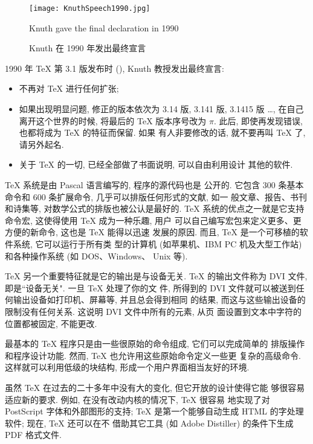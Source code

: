 \begin{figure}
  \centering
  \texttt{[image: KnuthSpeech1990.jpg]}\\
  \caption{Knuth  在 1990 年发出最终宣言}{Knuth gave the final declaration in 1990}
  \label{fig:KnuthSpeech1990}
\end{figure}


1990 年 \TeX{} \index{\TeX} 第 3.1 版发布时 (\cite{BaoTaiLei2008}), Knuth  教授发出最终宣言:
\begin{itemize}
  \item 不再对 \TeX{} \index{\TeX} 进行任何扩张;
  \item 如果出现明显问题, 修正的版本依次为 3.14 版, 3.141 版, 3.1415 版 \ldots,
        在自己离开这个世界的时候, 将最后的 \TeX{} \index{\TeX} 版本序号改为 $\pi$.
        此后, 即使再发现错误, 也都将成为 \TeX{} \index{\TeX} 的特征而保留. 如果
        有人非要修改的话, 就不要再叫 \TeX{} \index{\TeX} 了, 请另外起名.
  \item 关于 \TeX{} \index{\TeX} 的一切, 已经全部做了书面说明, 可以自由利用设计
        其他的软件.
\end{itemize}

\TeX{} \index{\TeX} 系统是由 Pascal  语言编写的, 程序的源代码也是
公开的. 它包含 300 条基本命令和 600 条扩展命令, 几乎可以排版任何形式的文献, 如一
般文章、报告、书刊和诗集等, 对数学公式的排版也被公认是最好的. \TeX{} \index{\TeX}
系统的优点之一就是它支持命令宏, 这使得使用 \TeX{} \index{\TeX} 成为一种乐趣, 用户
可以自己编写宏包来定义更多、更方便的新命令, 这也是 \TeX{} \index{\TeX} 能得以迅速
发展的原因. 而且, \TeX{} \index{\TeX} 是一个可移植的软件系统, 它可以运行于所有类
型的计算机 (如苹果机、IBM PC 机及大型工作站) 和各种操作系统 (如 DOS、Windows、
Unix 等).

\TeX{} \index{\TeX} 另一个重要特征就是它的输出是与设备无关. \TeX{} \index{\TeX}
的输出文件称为 DVI 文件, 即是``设备无关". 一旦 \TeX{} \index{\TeX} 处理了你的文
件, 所得到的 DVI 文件就可以被送到任何输出设备如打印机、屏幕等, 并且总会得到相同
的结果, 而这与这些输出设备的限制没有任何关系. 这说明 DVI 文件中所有的元素, 从页
面设置到文本中字符的位置都被固定, 不能更改.

最基本的 \TeX{} \index{\TeX} 程序只是由一些很原始的命令组成, 它们可以完成简单的
排版操作和程序设计功能. 然而, \TeX{} \index{\TeX} 也允许用这些原始命令定义一些更
复杂的高级命令. 这样就可以利用低级的块结构, 形成一个用户界面相当友好的环境.

虽然 \TeX{} \index{\TeX} 在过去的二十多年中没有大的变化, 但它开放的设计使得它能
够很容易适应新的要求.  例如, 在没有改动内核的情况下, \TeX{} \index{\TeX} 很容易
地实现了对 PostScript 字体和外部图形的支持; \TeX{} \index{\TeX}
是第一个能够自动生成 HTML 的字处理软件; 现在, \TeX{} \index{\TeX} 还可以在不
借助其它工具 (如 Adobe Distiller) 的条件下生成 PDF 格式文件.

